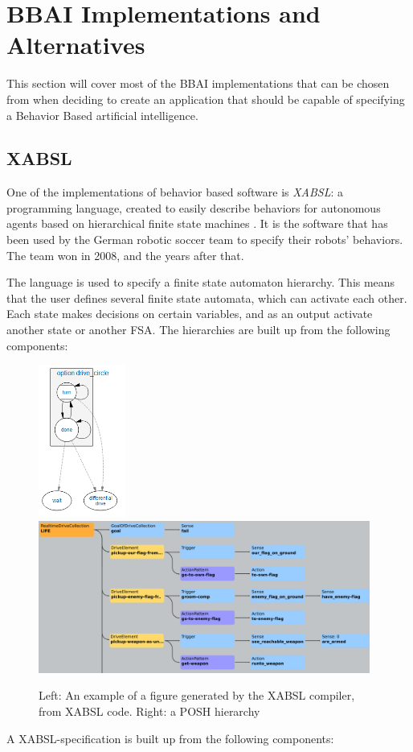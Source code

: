 \documentclass[a4paper,10pt]{article}
\begin{document}
\section{BBAI Implementations and Alternatives}
This section will cover most of the BBAI implementations that can be chosen from
when deciding to create an application that should be capable of specifying a
Behavior Based artificial intelligence. 

\subsection{XABSL}
One of the implementations of behavior based software is \textit{XABSL}: a
 programming language, created to easily describe behaviors for autonomous agents
based on hierarchical finite state machines \cite{loetzsch2003xabsl}. It is the
software that has been used by the German robotic soccer team to specify their
robots' behaviors. The team won in 2008, and the years after that.

The language is used to specify a finite state automaton hierarchy. This means
that the user defines several finite state automata, which can activate each
other. Each state makes decisions on certain variables, and as an output
activate another state or another FSA. The hierarchies are built up from the
following components:

\begin{figure}
    \centering
        \includegraphics[height=5cm]{../files/option_drive_circle.png}
        \includegraphics[height=5cm]{images/POSH-smaller.png}
    \label{fig:simpleFsm}
    \caption[XABSL hierarchy and POSH hierarchy]{Left: An example of a figure generated by the XABSL compiler, from
    XABSL code. Right: a POSH hierarchy}
\end{figure}
A XABSL-specification is built up from the following components:
\end{document}
